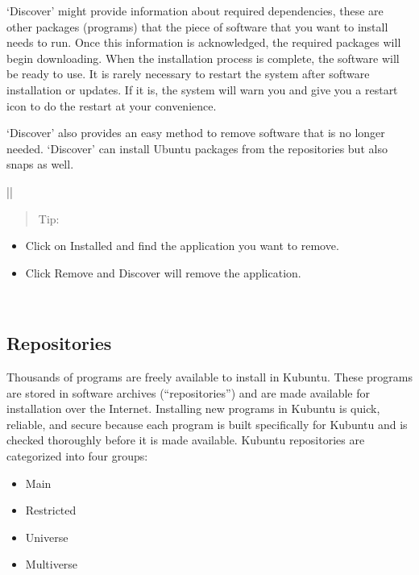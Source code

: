 \documentclass[letterpaper,10pt,english]{sphinxmanual}
\begin{document}
\noindent{}

‘Discover’ might provide information about required dependencies, these are other packages (programs) that the piece of software that you want to install needs to run. Once this information is acknowledged, the required packages will begin downloading. When the installation process is complete, the software will be ready to use. It is rarely necessary to restart the system after software installation or updates. If it is, the system will warn you and give you a restart icon to do the restart at your convenience.

‘Discover’ also provides an easy method to remove software that is no longer needed. ‘Discover’ can install Ubuntu packages from the repositories but also snaps as well.


\begin{savenotes}\sphinxattablestart
\centering
\begin{tabular}[t]{|*{1}{|}}
\hline
\begin{quote}

Tip:
\end{quote}
\begin{itemize}
\item {} 
Click on Installed and find the application you want to remove.

\item {} 
Click Remove and Discover will remove the application.

\end{itemize}
\\
\hline
\end{tabular}
\par
\sphinxattableend\end{savenotes}


\subsection{Repositories}
\label{\detokenize{docs/advanced:repositories}}
Thousands of programs are freely available to install in Kubuntu. These programs are stored in software archives (“repositories”) and are made available for installation over the Internet. Installing new programs in Kubuntu is quick, reliable, and secure because each program is built specifically for Kubuntu and is checked thoroughly before it is made available. Kubuntu repositories are categorized into four groups:
\begin{itemize}
\item {} 
Main

\item {} 
Restricted

\item {} 
Universe

\item {} 
Multiverse

\end{itemize}
\end{document}
